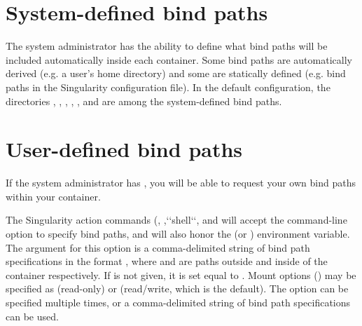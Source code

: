 \documentclass[letterpaper,10pt,english]{sphinxmanual}
\begin{document}
\section{System-defined bind paths}
\label{\detokenize{bind_paths_and_mounts:system-defined-bind-paths}}
The system administrator has the ability to define what bind paths will be
included automatically inside each container. Some bind paths are automatically
derived (e.g. a user’s home directory) and some are statically defined (e.g.
bind paths in the Singularity configuration file). In the default
configuration, the directories  ,  ,  ,  ,
, and  are among the system-defined bind paths.


\section{User-defined bind paths}
\label{\detokenize{bind_paths_and_mounts:user-defined-bind-paths}}
If the system administrator has ,
you will be able to request your own bind paths within your container.

The Singularity action commands (,  ,{}`{}`shell{}`{}`, and
 will accept the  command-line option to specify
bind paths, and will also honor the  (or
) environment variable. The argument for this option is
a comma-delimited string of bind path specifications in the format
, where  and  are paths outside and inside
of the container respectively. If  is not given, it is set equal to
. Mount options () may be specified as  (read-only) or
 (read/write, which is the default). The  option can be
specified multiple times, or a comma-delimited string of bind path
specifications can be used.
\end{document}
